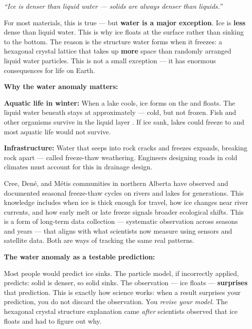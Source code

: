 \documentclass[11pt, a4paper]{article}
\newcommand{\blank}[1]{\underline{\hspace{#1}}}
\begin{document}
\begin{tcolorbox}[misconc]
\textit{``Ice is denser than liquid water --- solids are always denser than liquids.''}

\medskip
For most materials, this is true --- but \textbf{water is a major exception}. Ice is \textbf{less} dense than liquid water. This is why ice floats at the surface rather than sinking to the bottom. The reason is the structure water forms when it freezes: a hexagonal crystal lattice that takes up \textbf{more} space than randomly arranged liquid water particles. This is not a small exception --- it has enormous consequences for life on Earth.
\end{tcolorbox}

\medskip
\textbf{Why the water anomaly matters:}

\textbf{Aquatic life in winter:} When a lake cools, ice forms on the \blank{2.5cm} and floats. The liquid water beneath stays at approximately \blank{2cm} --- cold, but not frozen. Fish and other organisms survive in the liquid layer \blank{1.5cm}. If ice sank, lakes could freeze \blank{2cm} to \blank{2cm} and most aquatic life would not survive.

\medskip
\textbf{Infrastructure:} Water that seeps into rock cracks and freezes expands, breaking rock apart --- called freeze-thaw weathering. Engineers designing roads in cold climates must account for this in drainage design.

\begin{tcolorbox}[fnmi]
\small Cree, Den\'e, and M\'etis communities in northern Alberta have observed and documented seasonal freeze-thaw cycles on rivers and lakes for generations. This knowledge includes when ice is thick enough for travel, how ice changes near river currents, and how early melt or late freeze signals broader ecological shifts. This is a form of long-term data collection --- systematic observation across seasons and years --- that aligns with what scientists now measure using sensors and satellite data. Both are ways of tracking the same real patterns.
\end{tcolorbox}

\medskip
\textbf{The water anomaly as a testable prediction:}

Most people would predict ice sinks. The particle model, if incorrectly applied, predicts: solid is denser, so solid sinks. The observation --- ice floats --- \textbf{surprises} that prediction. This is exactly how science works: when a result surprises your prediction, you do not discard the observation. You \textit{revise your model}. The hexagonal crystal structure explanation came \textit{after} scientists observed that ice floats and had to figure out why.
\end{document}
